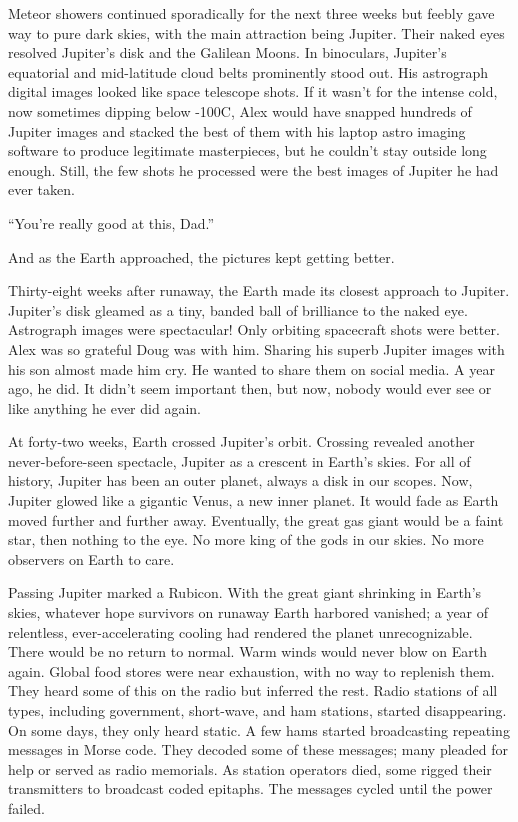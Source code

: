 Meteor showers continued sporadically for the next three weeks but
feebly gave way to pure dark skies, with the main attraction being
Jupiter. Their naked eyes resolved Jupiter's disk and the Galilean
Moons. In binoculars, Jupiter's equatorial and mid-latitude cloud belts
prominently stood out. His astrograph digital images looked like space
telescope shots. If it wasn't for the intense cold, now sometimes
dipping below -100C, Alex would have snapped hundreds of Jupiter images
and stacked the best of them with his laptop astro imaging software to
produce legitimate masterpieces, but he couldn't stay outside long
enough. Still, the few shots he processed were the best images of
Jupiter he had ever taken.

``You're really good at this, Dad.''

And as the Earth approached, the pictures kept getting better.

Thirty-eight weeks after runaway, the Earth made its closest approach to
Jupiter. Jupiter's disk gleamed as a tiny, banded ball of brilliance to
the naked eye. Astrograph images were spectacular! Only orbiting
spacecraft shots were better. Alex was so grateful Doug was with him.
Sharing his superb Jupiter images with his son almost made him cry. He
wanted to share them on social media. A year ago, he did. It didn't seem
important then, but now, nobody would ever see or like anything he ever
did again.

At forty-two weeks, Earth crossed Jupiter's orbit. Crossing revealed
another never-before-seen spectacle, Jupiter as a crescent in Earth's
skies. For all of history, Jupiter has been an outer planet, always a
disk in our scopes. Now, Jupiter glowed like a gigantic Venus, a new
inner planet. It would fade as Earth moved further and further away.
Eventually, the great gas giant would be a faint star, then nothing to
the eye. No more king of the gods in our skies. No more observers on
Earth to care.

Passing Jupiter marked a Rubicon. With the great giant shrinking in
Earth's skies, whatever hope survivors on runaway Earth harbored
vanished; a year of relentless, ever-accelerating cooling had rendered
the planet unrecognizable. There would be no return to normal. Warm
winds would never blow on Earth again. Global food stores were near
exhaustion, with no way to replenish them. They heard some of this on
the radio but inferred the rest. Radio stations of all types, including
government, short-wave, and ham stations, started disappearing. On some
days, they only heard static. A few hams started broadcasting repeating
messages in Morse code. They decoded some of these messages; many
pleaded for help or served as radio memorials. As station operators
died, some rigged their transmitters to broadcast coded epitaphs. The
messages cycled until the power failed.

